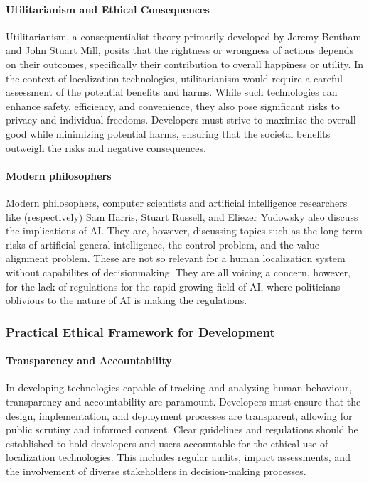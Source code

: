 \paragraph{Utilitarianism and Ethical Consequences}
Utilitarianism, a consequentialist theory primarily developed by Jeremy Bentham and John Stuart Mill, posits that the rightness or wrongness of actions depends on their outcomes, specifically their contribution to overall happiness or utility. In the context of localization technologies, utilitarianism would require a careful assessment of the potential benefits and harms. While such technologies can enhance safety, efficiency, and convenience, they also pose significant risks to privacy and individual freedoms. Developers must strive to maximize the overall good while minimizing potential harms, ensuring that the societal benefits outweigh the risks and negative consequences.

\paragraph{Modern philosophers}
Modern philosophers, computer scientists and artificial intelligence researchers like (respectively) Sam Harris, Stuart Russell, and Eliezer Yudowsky also discuss the implications of AI. They are, however, discussing topics such as the long-term risks of artificial general intelligence, the control problem, and the value alignment problem. These are not so relevant for a human localization system without capabilites of decisionmaking. They are all voicing a concern, however, for the lack of regulations for the rapid-growing field of AI, where politicians oblivious to the nature of AI is making the regulations. 

\subsubsection{Practical Ethical Framework for Development}

\paragraph{Transparency and Accountability}
In developing technologies capable of tracking and analyzing human behaviour, transparency and accountability are paramount. Developers must ensure that the design, implementation, and deployment processes are transparent, allowing for public scrutiny and informed consent. Clear guidelines and regulations should be established to hold developers and users accountable for the ethical use of localization technologies. This includes regular audits, impact assessments, and the involvement of diverse stakeholders in decision-making processes.

